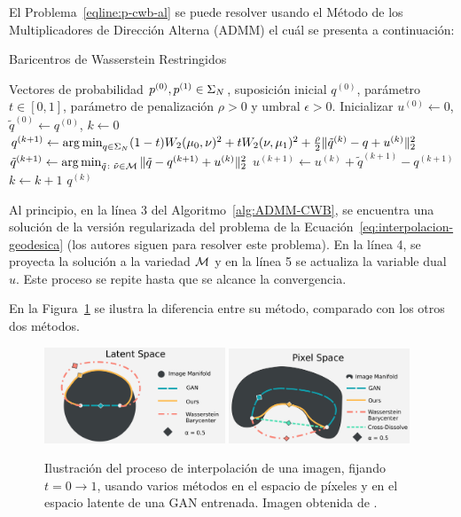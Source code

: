 El Problema~\eqref{eqline:p-cwb-al} se puede resolver usando el Método de los Multiplicadores de Dirección Alterna (ADMM) \cite[Cap. 3]{boyd2011distributed} el cuál se presenta a continuación:

\begin{algorithm}[H]
    \caption{Baricentros de Wasserstein Restringidos \cite{simon2020barycenters}}\label{alg:ADMM-CWB}
    \begin{algorithmic}[1]
        \Require Vectores de probabilidad $p^{(0)}, p^{(1)} \in \Simplex[N]$, suposición inicial $q^{(0)}$, parámetro $t\in[0, 1]$, parámetro de penalización $\rho>0$ y umbral $\epsilon>0$.
        \State Inicializar $u^{(0)} \gets 0$, $\tilde q^{(0)} \gets q^{(0)}$, $k \gets 0$
        \Repeat
        \State $q^{(k+1)} \gets \argmin_{q\in\Simplex[N]}  (1-t) \Wasserstein[2]{\mu_0}{\nu}^2 + t\Wasserstein[2]{\nu}{\mu_1}^2 + \frac{\rho}{2} \| \tilde q^{(k)} - q + u^{(k)} \|_2^2$
        \State $\tilde q^{(k+1)} \gets \argmin_{\tilde q \colon \tilde \nu \in \Manifold } \| \tilde q - q^{(k+1)} + u^{(k)} \|_2^2 $
        \State $u^{(k+1)} \gets u^{(k)} + \tilde q^{(k+1)} - q^{(k+1)}$
        \State $k \gets k + 1$
        \State\Return $q^{(k)}$
    \end{algorithmic}
\end{algorithm}

Al principio, en la línea 3 del Algoritmo~\ref{alg:ADMM-CWB}, se encuentra una solución de la versión regularizada del problema de la Ecuación~\eqref{eq:interpolacion-geodesica} (los autores siguen \cite{cuturi2016smoothed} para resolver este problema). En la línea 4, se proyecta la solución a la variedad $\Manifold$ y en la línea 5 se actualiza la variable dual $u$. Este proceso se repite hasta que se alcance la convergencia.

En la Figura~\ref{fig:latent-pixel-space} se ilustra la diferencia entre su método, comparado con los otros dos métodos.

\begin{figure}[H]
    \centering
    \includegraphics[width=0.48\textwidth]{img/cbw/latent-space.png}
    \includegraphics[width=0.48\textwidth]{img/cbw/pixel-space.png}
    \caption{
        Ilustración del proceso de interpolación de una imagen, fijando $t = 0 \to 1$, usando varios métodos en el espacio de píxeles y en el espacio latente de una GAN entrenada.
        Imagen obtenida de \cite{simon2020barycenters}.
    }
    \label{fig:latent-pixel-space}
\end{figure}
